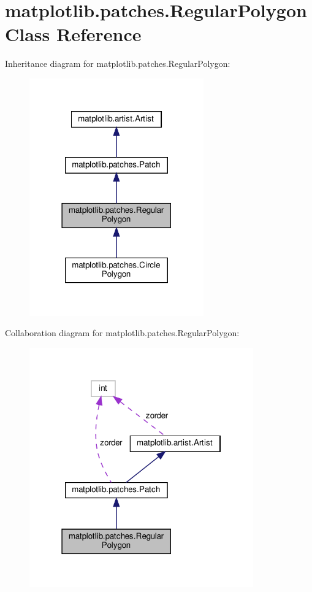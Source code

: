 \hypertarget{classmatplotlib_1_1patches_1_1RegularPolygon}{}\section{matplotlib.\+patches.\+Regular\+Polygon Class Reference}
\label{classmatplotlib_1_1patches_1_1RegularPolygon}


Inheritance diagram for matplotlib.\+patches.\+Regular\+Polygon\+:
\nopagebreak
\begin{figure}[H]
\begin{center}
\leavevmode
\includegraphics[width=213pt]{classmatplotlib_1_1patches_1_1RegularPolygon__inherit__graph}
\end{center}
\end{figure}


Collaboration diagram for matplotlib.\+patches.\+Regular\+Polygon\+:
\nopagebreak
\begin{figure}[H]
\begin{center}
\leavevmode
\includegraphics[width=274pt]{classmatplotlib_1_1patches_1_1RegularPolygon__coll__graph}
\end{center}
\end{figure}
